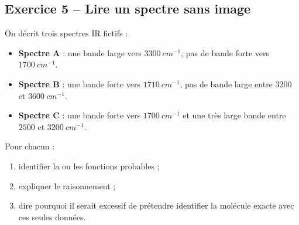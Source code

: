 \documentclass[11pt,a4paper]{article}
\begin{document}
\subsection{Exercice 5 -- Lire un spectre sans image}

\begin{enoncebox}
On décrit trois spectres IR fictifs :

\begin{itemize}
    \item \textbf{Spectre A} : une bande large vers \(3300\ \si{cm^{-1}}\), pas de bande forte vers \(1700\ \si{cm^{-1}}\).
    \item \textbf{Spectre B} : une bande forte vers \(1710\ \si{cm^{-1}}\), pas de bande large entre \(3200\) et \(3600\ \si{cm^{-1}}\).
    \item \textbf{Spectre C} : une bande forte vers \(1700\ \si{cm^{-1}}\) et une très large bande entre \(2500\) et \(3200\ \si{cm^{-1}}\).
\end{itemize}

Pour chacun :
\begin{enumerate}[label=\arabic*)]
    \item identifier la ou les fonctions probables ;
    \item expliquer le raisonnement ;
    \item dire pourquoi il serait excessif de prétendre identifier la molécule exacte avec ces seules données.
\end{enumerate}
\end{enoncebox}
\end{document}
